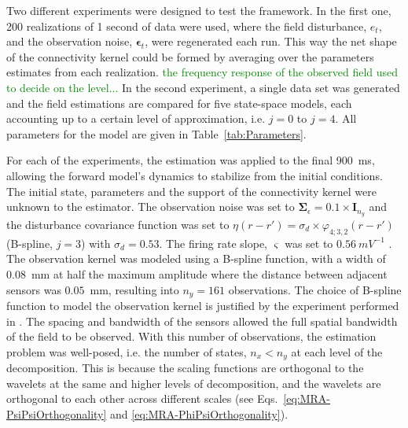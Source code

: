 \documentclass[review,authoryear,3p]{elsarticle}
\newcommand{\dean}[1]{\textcolor{green}{#1}}
\begin{document}
Two different experiments were designed to test the framework. In the first one, 200 realizations of 1 second of data were used, where the field disturbance, $e_t$, and the observation noise, $\boldsymbol\epsilon_t$, were regenerated each run. This way the net shape of the connectivity kernel could be formed by averaging over the parameters estimates from each realization. \dean{the frequency response of the observed field used to decide on the level...} In the second experiment, a single data set was generated and the field estimations are compared for five state-space models, each accounting up to a certain level of approximation, i.e. $j=0$ to $j=4$. All parameters for the model are given in Table~\ref{tab:Parameters}.

For each of the experiments, the estimation was applied to the final 900~ms, allowing the forward model's dynamics to stabilize from the initial conditions. The initial state, parameters and the support of the connectivity kernel were unknown to the estimator. The observation noise was set to $\boldsymbol\Sigma_{\epsilon}=0.1 \times \mathbf{I}_{n_y}$ and the disturbance covariance function was set to $\eta(r-r') = \sigma_d\times\varphi_{4;3,2}(r-r')$ (B-spline, $j=3$) with $\sigma_d=0.53$.  The firing rate slope, $\varsigma$ was set to $0.56~mV^{-1}$ \citep{Wendling2005}. The observation kernel was modeled using a B-spline function, with a width of 0.08~mm at half the maximum amplitude where the distance between adjacent sensors was $0.05$~mm, resulting into $n_y = 161$ observations. The choice of B-spline function to model the observation kernel is justified by the experiment performed in \citep{Freestone2011}. The spacing and bandwidth of the sensors allowed the full spatial bandwidth of the field to be observed.  With this number of observations, the estimation problem was well-posed, i.e. the number of states, $n_x < n_y$ at each level of the decomposition. This is because the scaling functions are orthogonal to the wavelets at the same and higher levels of decomposition, and  the wavelets are orthogonal to each other across different scales (see Eqs.~\eqref{eq:MRA-PsiPsiOrthogonality} and \eqref{eq:MRA-PhiPsiOrthogonality}).
\end{document}
